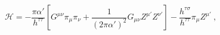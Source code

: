 \begin{equation}
\mathcal{H} = -\frac{\pi\alpha'}{h^{\tau\tau}} \left[
              G^{\mu\nu}\pi_\mu \pi_\nu +
              \frac{1}{(2\pi\alpha')^2}
              G_{\mu\nu}Z^{\mu\prime} Z^{\nu\prime}
              \right] -
              \frac{h^{\tau\sigma}}{h^{\tau\tau}}
              \pi_\mu Z^{\mu\prime} \ ,
\end{equation}

